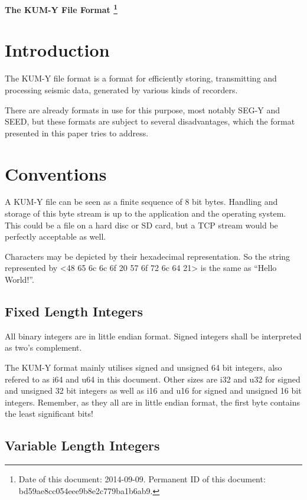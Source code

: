 \documentclass[DIV=10]{scrartcl}
\begin{document}
\strut

\vspace{1cm}

\centerline{\huge \textbf{The KUM-Y File Format%
\footnote{\raggedright Date of this document: 2014-09-09.
Permanent ID of this document: bd59ae8cc054eee9b8e2c779ba1b6ab9.}}}

\vspace{1cm}

\section{Introduction}

The KUM-Y file format is a format for efficiently storing, transmitting and processing seismic data, generated by various kinds of recorders.

There are already formats in use for this purpose, most notably SEG-Y and SEED, but these formats are subject to several disadvantages, which the format presented in this paper tries to address.

\section{Conventions}

A KUM-Y file can be seen as a finite sequence of 8 bit bytes.
Handling and storage of this byte stream is up to the application and the operating system.
This could be a file on a hard disc or SD card, but a TCP stream would be perfectly acceptable as well.

Characters may be depicted by their hexadecimal representation.
So the string represented by <48 65 6c 6c 6f 20 57 6f 72 6c 64 21> is the same as “Hello World!”.

\subsection{Fixed Length Integers}

All binary integers are in little endian format.
Signed integers shall be interpreted as two’s complement.

The KUM-Y format mainly utilises signed and unsigned 64 bit integers, also refered to as i64 and u64 in this document.
Other sizes are i32 and u32 for signed and unsigned 32 bit integers as well as i16 and u16 for signed and unsigned 16 bit integers.
Remember, as they all are in little endian format, the first byte contains the least significant bits!

\subsection{Variable Length Integers}
\end{document}
